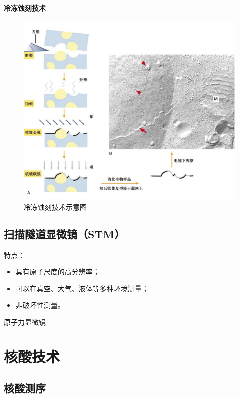 \paragraph{冷冻蚀刻技术}

\begin{figure}[htbp]
	\centering
	\includegraphics[width=\linewidth]{Pics/冷冻蚀刻技术示意图}
	\caption{冷冻蚀刻技术示意图}
	\label{fig:cryoFractureTechniqueSchematicDiagram}
\end{figure}

\subsection{扫描隧道显微镜（STM）}

特点：
\begin{itemize}
	\item 具有原子尺度的高分辨率；
	\item 可以在真空、大气、液体等多种环境测量；
	\item 非破坏性测量。
\end{itemize}

原子力显微镜


\section{核酸技术}

\subsection{核酸测序}

